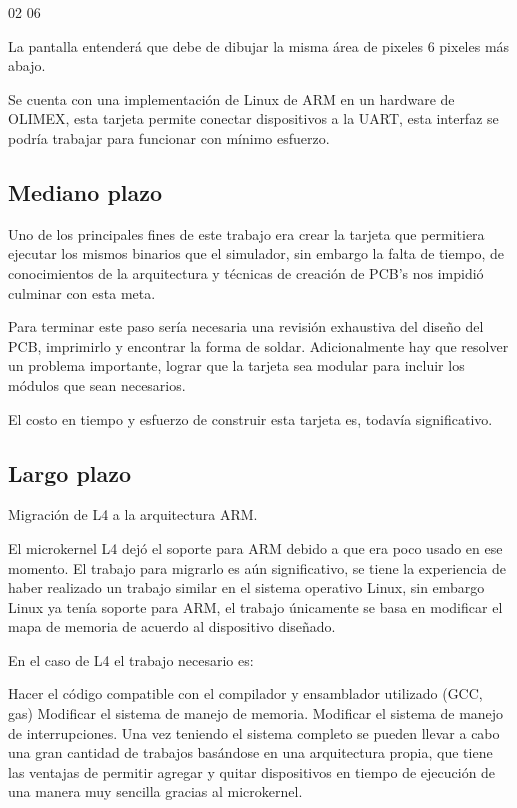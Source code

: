 02 06

La pantalla entenderá que debe de dibujar la misma área de pixeles 6 pixeles más abajo.

Se cuenta con una implementación de Linux de ARM en un hardware de OLIMEX, esta tarjeta permite conectar dispositivos a la UART, esta interfaz se podría trabajar para funcionar con mínimo esfuerzo.

\subsection{Mediano plazo}

Uno de los principales fines de este trabajo era crear la tarjeta que permitiera ejecutar los mismos binarios que el simulador, sin embargo la falta de tiempo, de conocimientos de la arquitectura y técnicas de creación de PCB's nos impidió culminar con esta meta.

Para terminar este paso sería necesaria una revisión exhaustiva del diseño del PCB, imprimirlo y encontrar la forma de soldar. Adicionalmente hay que resolver un problema importante, lograr que la tarjeta sea modular para incluir los módulos que sean necesarios.

El costo en tiempo y esfuerzo de construir esta tarjeta es, todavía significativo.

\subsection{Largo plazo}

Migración de L4 a la arquitectura ARM.

El microkernel L4 dejó el soporte para ARM debido a que era poco usado en ese momento. El trabajo para migrarlo es aún significativo, se tiene la experiencia de haber realizado un trabajo similar en el sistema operativo Linux, sin embargo Linux ya tenía soporte para ARM, el trabajo únicamente se basa en modificar el mapa de memoria de acuerdo al dispositivo diseñado.

En el caso de L4 el trabajo necesario es:

Hacer el código compatible con el compilador y ensamblador utilizado (GCC, gas)
Modificar el sistema de manejo de memoria.
Modificar el sistema de manejo de interrupciones.
Una vez teniendo el sistema completo se pueden llevar a cabo una gran cantidad de trabajos basándose en una arquitectura propia, que tiene las ventajas de permitir agregar y quitar dispositivos en tiempo de ejecución de una manera muy sencilla gracias al microkernel.

